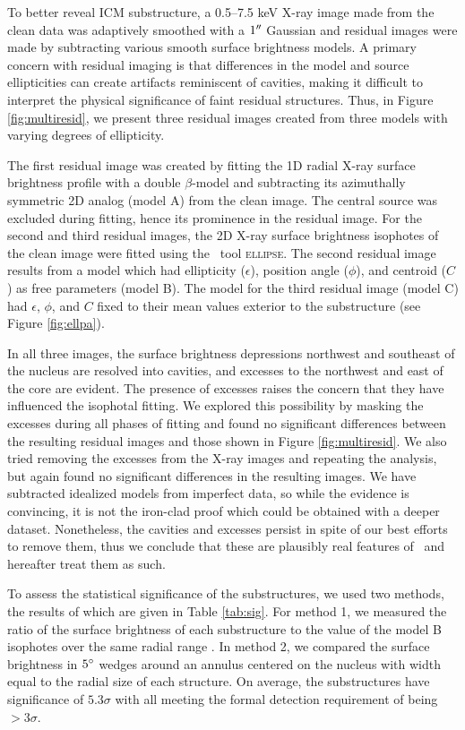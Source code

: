 \documentclass[useAMS,usenatbib]{mn2e}
\begin{document}
To better reveal ICM substructure, a 0.5--7.5 keV X-ray image made
from the clean data was adaptively smoothed with a $1\rm{^\prime}\hskip -0.1em\rm{^\prime}$ Gaussian
and residual images were made by subtracting various smooth surface
brightness models. A primary concern with residual imaging is that
differences in the model and source ellipticities can create artifacts
reminiscent of cavities, making it difficult to interpret the physical
significance of faint residual structures. Thus, in Figure
\ref{fig:multiresid}, we present three residual images created from
three models with varying degrees of ellipticity.

The first residual image was created by fitting the 1D radial X-ray
surface brightness profile with a double $\beta$-model
\citep{betamodel} and subtracting its azimuthally symmetric 2D analog
(model A) from the clean image. The central source was excluded during
fitting, hence its prominence in the residual image. For the second
and third residual images, the 2D X-ray surface brightness isophotes
of the clean image were fitted using the \iraf\ tool
\textsc{ellipse}. The second residual image results from a model which
had ellipticity ($\epsilon$), position angle ($\phi$), and centroid
($C$) as free parameters (model B). The model for the third residual
image (model C) had $\epsilon$, $\phi$, and $C$ fixed to their mean
values exterior to the substructure (see Figure \ref{fig:ellpa}).

In all three images, the surface brightness depressions northwest and
southeast of the nucleus are resolved into cavities, and excesses to
the northwest and east of the core are evident. The presence of
excesses raises the concern that they have influenced the isophotal
fitting. We explored this possibility by masking the excesses during
all phases of fitting and found no significant differences between the
resulting residual images and those shown in Figure
\ref{fig:multiresid}. We also tried removing the excesses from the
X-ray images and repeating the analysis, but again found no
significant differences in the resulting images. We have subtracted
idealized models from imperfect data, so while the evidence is
convincing, it is not the iron-clad proof which could be obtained with
a deeper dataset. Nonetheless, the cavities and excesses persist in
spite of our best efforts to remove them, thus we conclude that these
are plausibly real features of \irs\ and hereafter treat them as such.

To assess the statistical significance of the substructures, we used
two methods, the results of which are given in Table
\ref{tab:sig}. For method 1, we measured the ratio of the surface
brightness of each substructure to the value of the model B isophotes
over the same radial range \citep[see][for a similar
  approach]{hydraa}. In method 2, we compared the surface brightness
in $5\rm{^{\circ}}$ wedges around an annulus centered on the nucleus with
width equal to the radial size of each structure. On average, the
substructures have significance of $5.3\sigma$ with all meeting the
formal detection requirement of being $>3\sigma$.
\end{document}
